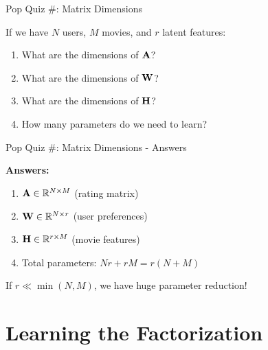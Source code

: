 \documentclass{beamer}
\begin{document}
\begin{frame}{Pop Quiz \#\thepopquiz: Matrix Dimensions}
\begin{popquizbox}{\thepopquiz}
If we have $N$ users, $M$ movies, and $r$ latent features:

\pause
\begin{enumerate}[<+->]
    \item What are the dimensions of $\mathbf{A}$? 
    \item What are the dimensions of $\mathbf{W}$?
    \item What are the dimensions of $\mathbf{H}$?
    \item How many parameters do we need to learn?
\end{enumerate}
\end{popquizbox}
\end{frame}

\begin{frame}{Pop Quiz \#\thepopquiz: Matrix Dimensions - Answers}
\begin{popquizbox}{\thepopquiz}
\textbf{Answers:}
\begin{enumerate}
    \item $\mathbf{A} \in \mathbb{R}^{N \times M}$ (rating matrix)
    \item $\mathbf{W} \in \mathbb{R}^{N \times r}$ (user preferences)
    \item $\mathbf{H} \in \mathbb{R}^{r \times M}$ (movie features)
    \item Total parameters: $Nr + rM = r(N + M)$
\end{enumerate}

\pause
\begin{keypointsbox}{}
If $r \ll \min(N,M)$, we have huge parameter reduction!
\end{keypointsbox}
\end{popquizbox}
\end{frame}

\section{Learning the Factorization}
\end{document}
